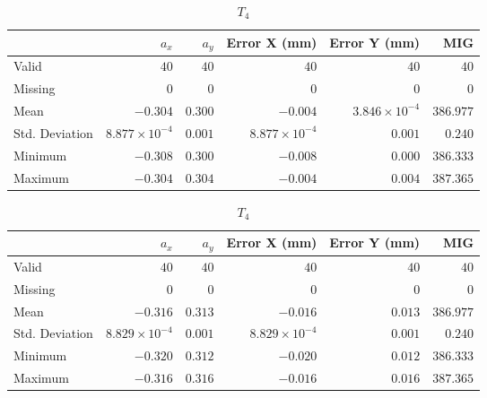 \begin{table}[h]
    \vspace{10pt} %
    
    \begin{subtable}{\textwidth}
        \centering
        \footnotesize
        \begin{tabular}{lrrrrr}
            \toprule
                & $a_x$ & $a_y$ & Error X (mm) & Error Y (mm) & MIG  \\
            \midrule
			Valid & $40$ & $40$ & $40$ & $40$ & $40$  \\
			Missing & $0$ & $0$ & $0$ & $0$ & $0$  \\
			Mean & $-0.304$ & $0.300$ & $-0.004$ & $3.846\times10^{-4}$ & $386.977$  \\
			Std. Deviation & $8.877\times10^{-4}$ & $0.001$ & $8.877\times10^{-4}$ & $0.001$ & $0.240$  \\
			Minimum & $-0.308$ & $0.300$ & $-0.008$ & $0.000$ & $386.333$  \\
			Maximum & $-0.304$ & $0.304$ & $-0.004$ & $0.004$ & $387.365$  \\
            \bottomrule
        \end{tabular}
        \caption{$T_3$}
    \end{subtable}

    \vspace{10pt}

    \begin{subtable}{\textwidth}
    \centering
    \footnotesize
    \begin{tabular}{lrrrrr}
        \toprule
            & $a_x$ & $a_y$ & Error X (mm) & Error Y (mm) & MIG  \\
        \midrule
        Valid & $40$ & $40$ & $40$ & $40$ & $40$  \\
        Missing & $0$ & $0$ & $0$ & $0$ & $0$  \\
        Mean & $-0.316$ & $0.313$ & $-0.016$ & $0.013$ & $386.977$  \\
        Std. Deviation & $8.829\times10^{-4}$ & $0.001$ & $8.829\times10^{-4}$ & $0.001$ & $0.240$  \\
        Minimum & $-0.320$ & $0.312$ & $-0.020$ & $0.012$ & $386.333$  \\
        Maximum & $-0.316$ & $0.316$ & $-0.016$ & $0.016$ & $387.365$  \\
        \bottomrule
    \end{tabular}
    \caption{$T_4$}
    \end{subtable}


\end{table}
